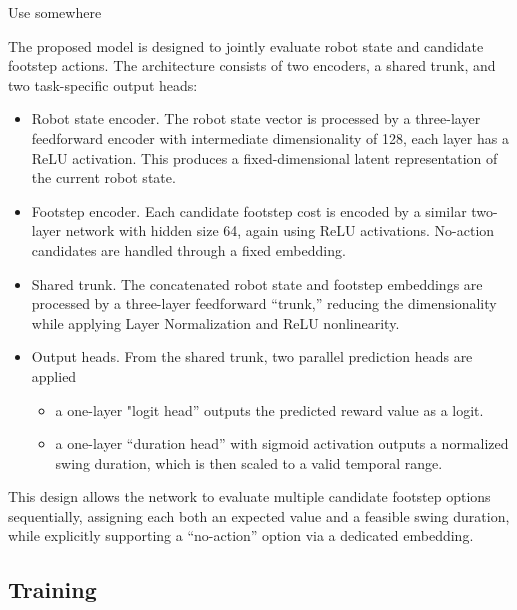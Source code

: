 \begin{todo}
  Use \cite{feng2021deep} somewhere
\end{todo}

The proposed model is designed to jointly evaluate robot state and
candidate footstep actions. The architecture consists of two
encoders, a shared trunk, and two task-specific output heads:

\begin{itemize}
  \item Robot state encoder. The robot state vector is processed by a
    three-layer feedforward encoder with intermediate dimensionality
    of 128, each layer has a ReLU activation.
    This produces a fixed-dimensional latent representation of the
    current robot state.
  \item Footstep encoder. Each candidate footstep cost is encoded by a similar
    two-layer network with hidden size 64, again using ReLU activations.
    No-action candidates are handled through a fixed embedding.
  \item Shared trunk. The concatenated robot state and footstep embeddings
    are processed by a three-layer feedforward “trunk,” reducing the
    dimensionality while applying Layer Normalization and ReLU nonlinearity.
  \item Output heads. From the shared trunk, two parallel prediction heads
    are applied

    \begin{itemize}
      \item a one-layer "logit head” outputs the predicted reward
        value as a logit.
      \item a one-layer “duration head” with sigmoid activation
        outputs a normalized swing duration, which is then scaled to a
        valid temporal range.
    \end{itemize}
\end{itemize}

This design allows the network to evaluate multiple candidate
footstep options sequentially, assigning each both an expected value
and a feasible swing duration, while explicitly supporting a
“no-action” option via a dedicated embedding.

\subsection{Training}

